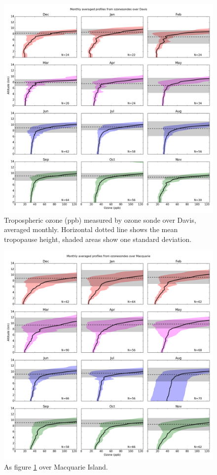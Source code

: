     \begin{figure}[!htbp]
      \includegraphics[width=\textwidth]{Figures/Ozone/Davis_sonde_monthprofiles.png}
      \caption{Tropospheric ozone (ppb) measured by ozone sonde over Davis, averaged monthly.
      Horizontal dotted line shows the mean tropopause height, shaded areas show one standard deviation.}
      \label{ch_o3:fig:GEOSChemMonthlyProfilesDavis}
    \end{figure}
    \begin{figure}[!htbp]
      \includegraphics[width=\textwidth]{Figures/Ozone/Macquarie_sonde_monthprofiles.png}
      \caption{As figure \ref{ch_o3:fig:GEOSChemMonthlyProfilesDavis} over Macquarie Island.}
      \label{ch_o3:fig:GEOSChemMonthlyProfilesMacquarie}
    \end{figure}
